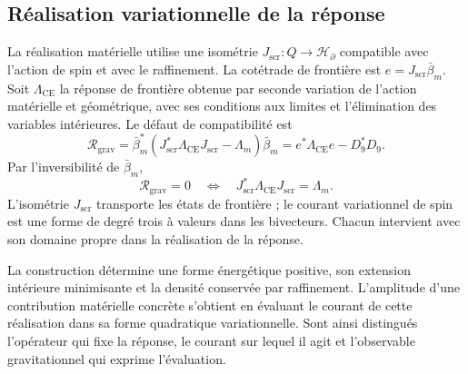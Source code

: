 \subsection{Réalisation variationnelle de la réponse}
\label{vii:sec:realizacion-respuesta}

La réalisation matérielle utilise une isométrie \(J_{\mathrm{scr}}:Q\longrightarrow\mathcal H_\partial\) compatible avec l'action de spin et avec le raffinement. La cotétrade de frontière est \(e=J_{\mathrm{scr}}\bar\beta_m\). Soit \(\Lambda_{\mathrm{CE}}\) la réponse de frontière obtenue par seconde variation de l'action matérielle et géométrique, avec ses conditions aux limites et l'élimination des variables intérieures. Le défaut de compatibilité est
\begin{equation}
 \mathcal R_{\mathrm{grav}}
 =\bar\beta_m^*
   (J_{\mathrm{scr}}^*\Lambda_{\mathrm{CE}}J_{\mathrm{scr}}-\Lambda_m)
   \bar\beta_m
 =e^*\Lambda_{\mathrm{CE}}e-D_9^*D_9.
 \label{vii:eq:defecto-respuesta}
\end{equation}
Par l'inversibilité de \(\bar\beta_m\),
\[
 \mathcal R_{\mathrm{grav}}=0
 \quad\Longleftrightarrow\quad
 J_{\mathrm{scr}}^*\Lambda_{\mathrm{CE}}J_{\mathrm{scr}}=\Lambda_m.
\]
L'isométrie \(J_{\mathrm{scr}}\) transporte les états de frontière ;
le courant variationnel de spin est une forme de degré trois à valeurs
dans les bivecteurs. Chacun intervient avec son domaine propre dans la
réalisation de la réponse.

La construction détermine une forme énergétique positive, son extension intérieure minimisante et la densité conservée par raffinement. L'amplitude d'une contribution matérielle concrète s'obtient en évaluant le courant de cette réalisation dans sa forme quadratique variationnelle. Sont ainsi distingués l'opérateur qui fixe la réponse, le courant sur lequel il agit et l'observable gravitationnel qui exprime l'évaluation.
